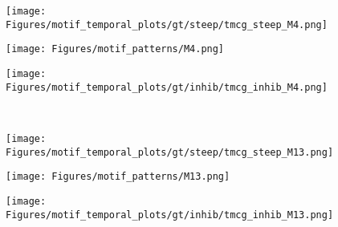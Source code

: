 \documentclass[smallextended]{svjour3}       %
\theoremstyle{definition}
\begin{document}
\begin{figure}[]
	\centering
	\hfill
	\begin{minipage}{0.30\textwidth}%
		\texttt{[image: Figures/motif\_temporal\_plots/gt/steep/tmcg\_steep\_M4.png]}			
	\end{minipage}
	\hfill
	\begin{minipage}{0\textwidth}%
		\texttt{[image: Figures/motif\_patterns/M4.png]}	
	\end{minipage}
	\hfill
	\begin{minipage}{0.35\textwidth}
		\texttt{[image: Figures/motif\_temporal\_plots/gt/inhib/tmcg\_inhib\_M4.png]}
	\end{minipage}
	\hfill
	\\
	\hfill
	\begin{minipage}{0.30\textwidth}%
		\texttt{[image: Figures/motif\_temporal\_plots/gt/steep/tmcg\_steep\_M13.png]}
	\end{minipage}
	\hfill
	\begin{minipage}{0\textwidth}%
		\texttt{[image: Figures/motif\_patterns/M13.png]}	
	\end{minipage}
	\hfill
	\begin{minipage}{0.35\textwidth}
		\texttt{[image: Figures/motif\_temporal\_plots/gt/inhib/tmcg\_inhib\_M13.png]}
	\end{minipage}
	

\end{figure}
\end{document}
